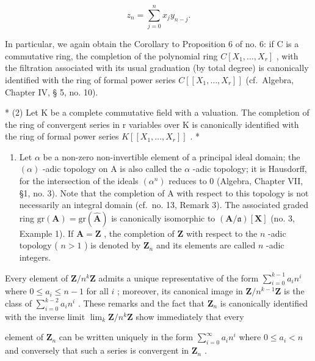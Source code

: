 \begin{enumerate}
\[
z _ {n} = \sum_ {j = 0} ^ {n} x _ {j} y _ {n - j}.\tag{26}
\]

In particular, we again obtain the Corollary to Proposition 6 of no. 6: if C is a commutative ring, the completion of the polynomial ring \(C[X_{1},\ldots,X_{r}]\) , with the filtration associated with its usual graduation (by total degree) is canonically identified with the ring of formal power series \(C[[X_{1},\ldots,X_{r}]]\) (cf.~Algebra, Chapter IV, § 5, no. 10).
\end{enumerate}

* (2) Let K be a complete commutative field with a valuation. The completion of the ring of convergent series in r variables over K is canonically identified with the ring of formal power series \(K[[X_{1},\ldots,X_{r}]]\) . *

\begin{enumerate}
\def\labelenumi{(\arabic{enumi})}
\setcounter{enumi}{2}
\tightlist
\item
  Let \(\alpha\) be a non-zero non-invertible element of a principal ideal domain; the \((\alpha)\) -adic topology on A is also called the \(\alpha\) -adic topology; it is Hausdorff, for the intersection of the ideals \((\alpha^n)\) reduces to 0 (Algebra, Chapter VII, §1, no. 3). Note that the completion of A with respect to this topology is not necessarily an integral domain (cf.~no. 13, Remark 3). The associated graded ring \(\mathrm{gr}(\mathbf{A}) = \mathrm{gr}(\hat{\mathbf{A}})\) is canonically isomorphic to \((\mathbf{A}/\mathfrak{a})[\mathbf{X}]\) (no. 3, Example 1). If \(\mathbf{A} = \mathbf{Z}\) , the completion of \(\mathbf{Z}\) with respect to the \(n\) -adic topology ( \(n > 1\) ) is denoted by \(\mathbf{Z}_n\) and its elements are called \(n\) -adic integers.
\end{enumerate}

Every element of \(\mathbf{Z} / n^k\mathbf{Z}\) admits a unique representative of the form \(\sum_{i=0}^{k-1} a_i n^i\) where \(0 \leqslant a_i \leqslant n - 1\) for all \(i\) ; moreover, its canonical image in \(\mathbf{Z} / n^{k-1}\mathbf{Z}\) is the class of \(\sum_{i=0}^{k-2} a_i n^i\) . These remarks and the fact that \(\mathbf{Z}_n\) is canonically identified with the inverse limit \(\lim_{k} \mathbf{Z}/n^k \mathbf{Z}\) show immediately that every

element of \(\mathbf{Z}_n\) can be written uniquely in the form \(\sum_{i=0}^{\infty} a_i n^i\) where \(0 \leqslant a_i < n\) and conversely that such a series is convergent in \(\mathbf{Z}_n\) .
\relax{}
